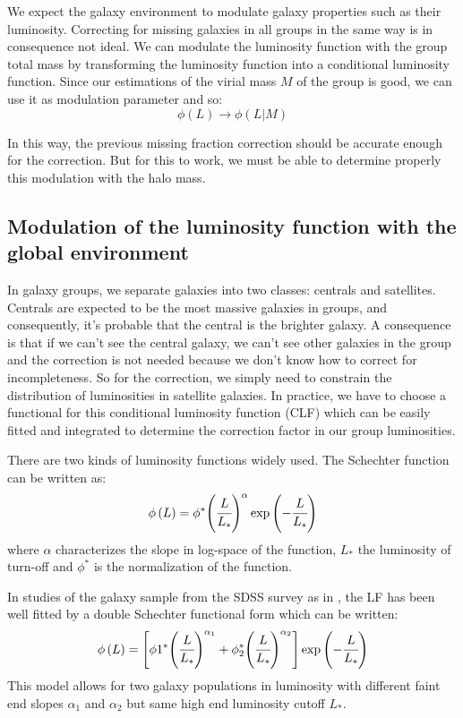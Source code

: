 We expect the galaxy environment to modulate galaxy properties such as their
luminosity. Correcting for missing galaxies in all groups in the same way is in
consequence not ideal. We can modulate the luminosity function with the group
total mass by transforming the luminosity function into a conditional
luminosity function. Since our estimations of the virial mass $M$ of the group
is good, we can use it as modulation parameter and so:
%
\begin{equation}
    \phi\left(L\right)\rightarrow\phi\left(L|M\right)
\end{equation}

In this way, the previous missing fraction correction should be accurate enough
for the correction. But for this to work, we must be able to determine properly
this modulation with the halo mass.

\subsection{Modulation of the luminosity function with the global environment}

In galaxy groups, we separate galaxies into two classes: centrals and
satellites. Centrals are expected to be the most massive galaxies in groups,
and consequently, it's probable that the central is the brighter galaxy. A
consequence is that if we can't see the central galaxy, we can't see other
galaxies in the group and the correction is not needed because we don't know
how to correct for incompleteness. So for the correction, we simply need to
constrain the distribution of luminosities in satellite galaxies. In practice,
we have to choose a functional for this conditional luminosity function (CLF)
which can be easily fitted and integrated to determine the correction factor in
our group luminosities.

There are two kinds of luminosity functions widely used. The Schechter function
can be written as:
%
\begin{equation}
    \phi\left(L\right)=\phi^*{\left(\cfrac{L}{L_*}\right)}^\alpha
    \exp\left(-\cfrac{L}{L_*}\right)
\end{equation}
%
where $\alpha$ characterizes the slope in log-space of the function, $L_*$ the
luminosity of turn-off and $\phi^*$ is the normalization of the function.

In studies of the galaxy sample from the SDSS survey as in \citet{Blanton+05},
the LF has been well fitted by a double Schechter functional form which can be
written:
%
\begin{equation}\label{eq:dblsch}
    \phi\left(L\right)=
    \left[\phi1^*{\left(\cfrac{L}{L_*}\right)}^{\alpha_1}+
    \phi_2^*{\left(\cfrac{L}{L_*}\right)}^{\alpha_2}\right]
    \exp\left(-\cfrac{L}{L_*}\right)
\end{equation}
%
This model allows for two galaxy populations in luminosity with different faint
end slopes $\alpha_1$ and $\alpha_2$ but same high end luminosity cutoff $L_*$.

